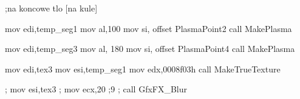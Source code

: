 ;na koncowe tlo [na kule]

	mov   edi,temp_seg1
	mov   al,100
	mov   si, offset PlasmaPoint2
	call  MakePlasma

	mov   edi,temp_seg3
	mov   al, 180
	mov   si, offset PlasmaPoint4
	call  MakePlasma


	mov   edi,tex3
	mov   esi,temp_seg1
	mov   edx,0008f03h
	call  MakeTrueTexture

;	 mov   esi,tex3
;	 mov   ecx,20 ;9
;	 call  GfxFX_Blur
